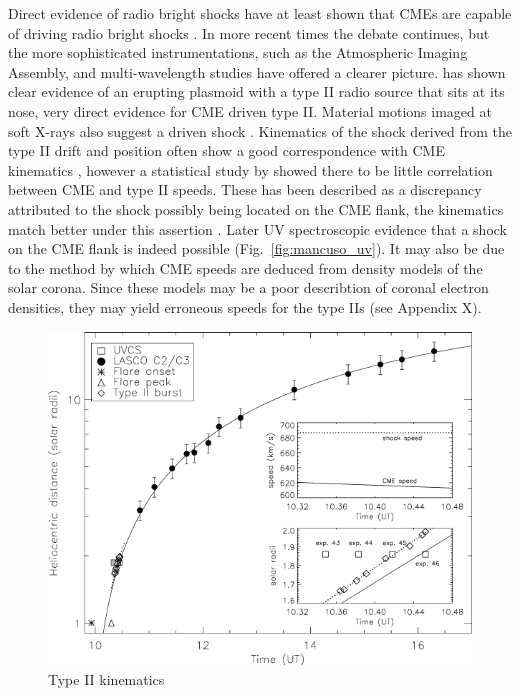 Direct evidence of radio bright shocks have at least shown that CMEs are capable of driving radio bright shocks \citep{maia2000}.
In more recent times the debate continues, but the more sophisticated instrumentations, such as the Atmospheric Imaging Assembly, and multi-wavelength studies have offered a clearer picture. \citet{bain2012} has shown clear evidence of an erupting plasmoid with a type II radio source that sits at its nose, very direct evidence for CME driven type II. Material motions imaged at soft X-rays also suggest a driven shock \citep{klein1999}. Kinematics of the shock derived from the type II drift and position often show a good correspondence with CME kinematics \citep{mancuso2011}, however a statistical study by \citet{reiner2001} showed there to be little correlation between CME and type II speeds. These has been described as a discrepancy attributed to the shock possibly being located on the CME flank, the kinematics match better under this assertion \citep{mancuso2004, cho2007, cho2012}. Later UV spectroscopic evidence that a shock on the CME flank is indeed possible (Fig.~\ref{fig:mancuso_uv}). It may also be due to the method by which CME speeds are deduced from density models of the solar corona. Since these models may be a poor describtion of coronal electron densities, they may yield erroneous speeds for the type IIs (see Appendix X).
\begin{figure}[t!]
\begin{center}
\includegraphics[scale=1.3, trim=1cm 0cm 0cm 0cm]{images/mancuso_kins.pdf}
\caption{Type II kinematics \citep{mancuso2011}}
\end{center}
\label{fig:mancuso}
\end{figure}

